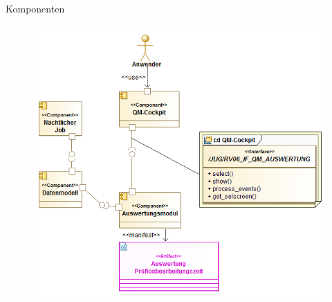 \begin{frame}{Komponenten}
\begin{figure}[tb]
\includegraphics[width=.9\textwidth]{images/Komponenten}
\end{figure}
\end{frame}
